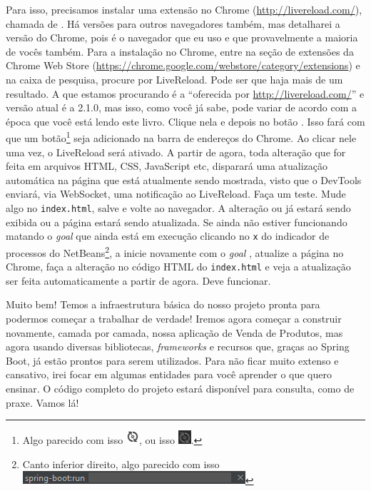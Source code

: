 Para isso, precisamos instalar uma extensão no Chrome (\url{http://livereload.com/}), chamada de . Há versões para outros navegadores também, mas detalharei a versão do Chrome, pois é o navegador que eu uso e que provavelmente a maioria de vocês também. Para a instalação no Chrome, entre na seção de extensões da Chrome Web Store (\url{https://chrome.google.com/webstore/category/extensions}) e na caixa de pesquisa, procure por LiveReload. Pode ser que haja mais de um resultado. A que estamos procurando é a ``oferecida por \url{http://livereload.com/}'' e versão atual é a 2.1.0, mas isso, como você já sabe, pode variar de acordo com a época que você está lendo este livro. Clique nela e depois no botão . Isso fará com que um botão\footnote{Algo parecido com isso \includegraphics[scale=1]{imagens/cap10BotaoLiveReloadBranco}, ou isso \includegraphics[scale=1]{imagens/cap10BotaoLiveReloadPreto}.} seja adicionado na barra de endereços do Chrome. Ao clicar nele uma vez, o LiveReload será ativado. A partir de agora, toda alteração que for feita em arquivos HTML, CSS, JavaScript etc, disparará uma atualização automática na página que está atualmente sendo mostrada, visto que o DevTools enviará, via WebSocket, uma notificação ao LiveReload. Faça um teste. Mude algo no \texttt{index.html}, salve e volte ao navegador. A alteração ou já estará sendo exibida ou a página estará sendo atualizada. Se ainda não estiver funcionando matando o \textit{goal}  que ainda está em execução clicando no \texttt{x} do indicador de processos do NetBeans\footnote{Canto inferior direito, algo parecido com isso \includegraphics[scale=1]{imagens/cap10MatarProcessoSpringBootRun}}, a inicie novamente com o \textit{goal} , atualize a página no Chrome, faça a alteração no código HTML do \texttt{index.html} e veja a atualização ser feita automaticamente a partir de agora. Deve funcionar.

Muito bem! Temos a infraestrutura básica do nosso projeto pronta para podermos começar a trabalhar de verdade! Iremos agora começar a construir novamente, camada por camada, nossa aplicação de Venda de Produtos, mas agora usando diversas bibliotecas, \textit{frameworks} e recursos que, graças ao Spring Boot, já estão prontos para serem utilizados. Para não ficar muito extenso e cansativo, irei focar em algumas entidades para você aprender o que quero ensinar. O código completo do projeto estará disponível para consulta, como de praxe. Vamos lá!


